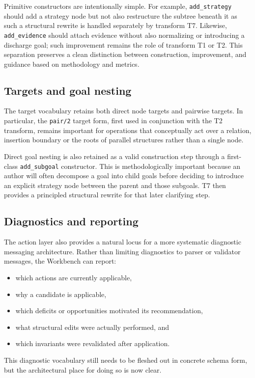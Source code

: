 \documentclass[12pt,twoside,a4paper]{article}
\begin{document}
Primitive constructors are intentionally simple.
For example, \texttt{add\_strategy} should add a strategy node but not also restructure the subtree beneath it as such a structural rewrite is handled separately by transform T7.
Likewise, \texttt{add\_evidence} should attach evidence without also normalizing or introducing a discharge goal; such improvement remains the role of transform T1 or T2.
This separation preserves a clean distinction between construction, improvement, and guidance based on methodology and metrics.

\subsection{Targets and goal nesting}

The target vocabulary retains both direct node targets and pairwise targets.
In particular, the \texttt{pair/2} target form, first used in conjunction with the T2 transform, remains important for operations that conceptually act over a relation, insertion boundary or the roots of parallel structures rather than a single node.

Direct goal nesting is also retained as a valid construction step through a first-class \texttt{add\_subgoal} constructor.
This is methodologically important because an author will often decompose a goal into child goals before deciding to introduce an explicit strategy node between the parent and those subgoals.
T7 then provides a principled structural rewrite for that later clarifying step.

\subsection{Diagnostics and reporting}

The action layer also provides a natural locus for a more systematic diagnostic messaging architecture.
Rather than limiting diagnostics to parser or validator messages, the Workbench can report:
\begin{itemize}
  \item which actions are currently applicable,
  \item why a candidate is applicable,
  \item which deficits or opportunities motivated its recommendation,
  \item what structural edits were actually performed, and
  \item which invariants were revalidated after application.
\end{itemize}
This diagnostic vocabulary still needs to be fleshed out in concrete schema form, but the architectural place for doing so is now clear.
\end{document}
